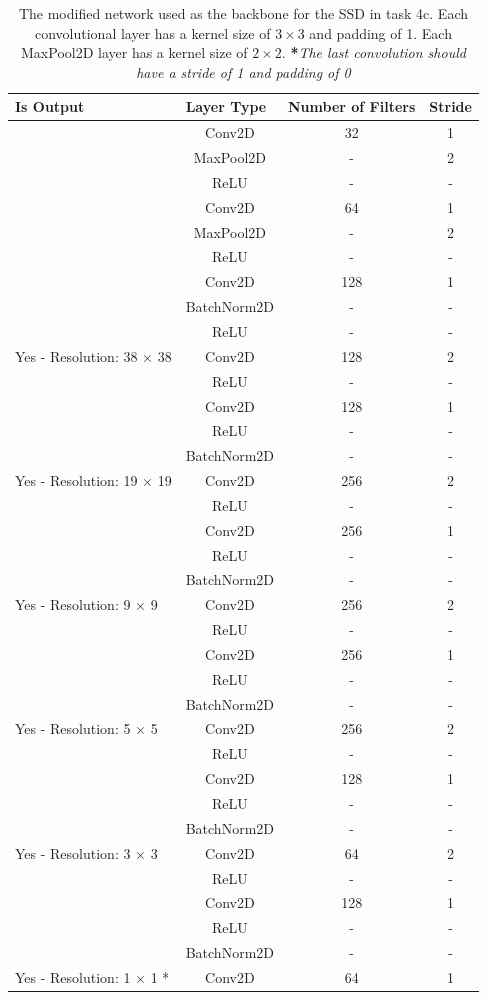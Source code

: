 \documentclass{article}
\begin{document}
\begin{table}[H]
\caption{The modified network used as the backbone for the SSD in task 4c. Each convolutional layer has a kernel size of $3 \times 3$ and padding of 1. Each MaxPool2D layer has a kernel size of $2 \times 2$. \textbf{*}\textit{The last
convolution should have a stride of 1 and padding of 0}
}
\label{tab:modified_net_4c}
\begin{tabular}{l|c|c|c}
\hline
Is Output & \multicolumn{1}{l|}{Layer Type} & \multicolumn{1}{l|}{Number of Filters} & \multicolumn{1}{l}{Stride} \\ \hline
 & Conv2D & 32 & 1 \\
 & MaxPool2D & - & 2 \\
 & ReLU & - & - \\
 & Conv2D & 64 & 1 \\
 & MaxPool2D & - & 2 \\
 & ReLU & - & - \\
 & Conv2D & 128 & 1 \\
   & BatchNorm2D & - & - \\
 & ReLU & - & - \\
Yes - Resolution: 38 × 38 & Conv2D & 128 & 2 \\ \hline
 & ReLU & - & - \\
 & Conv2D & 128 & 1 \\
 & ReLU & - & - \\
    & BatchNorm2D & - & - \\
Yes - Resolution: 19 × 19 & Conv2D & 256 & 2 \\ \hline
 & ReLU & - & - \\
 & Conv2D & 256 & 1 \\
 & ReLU & - & - \\
    & BatchNorm2D & - & - \\
Yes - Resolution: 9 × 9 & Conv2D & 256 & 2 \\ \hline
 & ReLU & - & - \\
 & Conv2D & 256 & 1 \\
 & ReLU & - & - \\
    & BatchNorm2D & - & - \\
Yes - Resolution: 5 × 5 & Conv2D & 256 & 2 \\ \hline
 & ReLU & - & - \\
 & Conv2D & 128 & 1 \\
 & ReLU & - & - \\
    & BatchNorm2D & - & - \\
Yes - Resolution: 3 × 3 & Conv2D & 64 & 2 \\ \hline
 & ReLU & - & - \\
 & Conv2D & 128 & 1 \\
 & ReLU & - & - \\
    & BatchNorm2D & - & - \\
Yes - Resolution: 1 × 1 * & Conv2D & 64 & 1 \\ \hline
\end{tabular}
\end{table}
\end{document}
